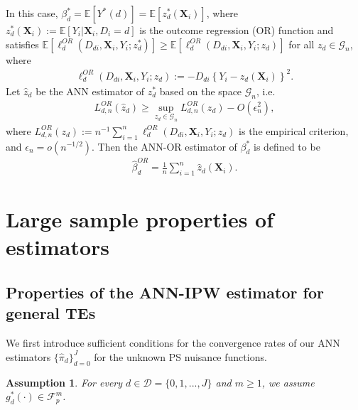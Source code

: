 \documentclass[11pt]{article}
\newtheorem{assumption}[]{Assumption}
\numberwithin{equation}{section}
\begin{document}
In this case, $\beta_d^*=\mathbb{E}[Y^*(d)]=\mathbb{E}[z_d^*(\boldsymbol{X}_{i})]$, where  $z_d^*(\boldsymbol{X}_{i}):=\mathbb{E}[Y_i|\boldsymbol{X}_{i},D_i=d]$ is the outcome regression (OR) function and satisfies $\mathbb{E}[\ell^{OR}_d(D_{di},\boldsymbol{X}_{i},Y_i;z^*_d)]\geq \mathbb{E}[\ell^{OR}_d(D_{di},\boldsymbol{X}_{i},Y_i;z_d)]$ for all $z_d\in\mathcal{G}_n$, where
\begin{align*}
	\ell_d^{OR}(D_{di},\boldsymbol{X}_{i},Y_i;z_d):=-D_{di}\left\{Y_i-z_d(\boldsymbol{X}_{i})\right\}^2.
\end{align*}		
Let $\widehat{z}_d$ be the ANN estimator of $z_d^*$ based on the space $\mathcal{G}_n$, i.e.
\begin{align}\label{as:Rhat_1st}
	L^{OR}_{d,n}(\widehat{z}_d)\geq \sup_{z_d\in\mathcal{G}_n}L^{OR}_{d,n}(z_d)-O(\epsilon^2_n),
\end{align}
where
$L^{OR}_{d,n}(z_d):=n^{-1}\sum_{i=1}^n\ell^{OR}_d(D_{di},\boldsymbol{X}_{i},Y_i;z_d)$
is the empirical criterion, and $\epsilon_n=o(n^{-1/2})$. Then the ANN-OR estimator of $\beta_d^*$ is defined to be
\begin{align}\label{def:tauhat_OR}
	\widehat{\beta}^{OR}_d=\frac{1}{n}\sum_{i=1}^n\widehat{z}_d(\boldsymbol{X}_{i}).
\end{align}

\section{Large sample properties of estimators}\label{sec:asymptotics}

\subsection{Properties of the ANN-IPW estimator for general TEs}\label{IPW-property}

We first introduce sufficient conditions for the convergence rates of our ANN estimators $\{\widehat{\pi}_d\}_{d=0}^J$ for the unknown PS nuisance functions.


	\begin{assumption}\label{as:parameter} 	For every $d\in \mathcal{D}=\{0,1,...,J\}$ and  $m\geq 1$, we assume $g _{d}^{\ast }(\cdot )\in \mathcal{F}_p^m$.
	\end{assumption}
\end{document}
